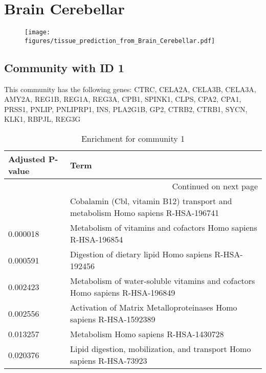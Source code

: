 
\section*{Brain Cerebellar}
\begin{figure}[h!]
\centering
\texttt{[image: figures/tissue\_prediction\_from\_Brain\_Cerebellar.pdf]}
\end{figure}



\subsection*{Community with ID 1}
This community has the following genes: CTRC, CELA2A, CELA3B, CELA3A, AMY2A, REG1B, REG1A, REG3A, CPB1, SPINK1, CLPS, CPA2, CPA1, PRSS1, PNLIP, PNLIPRP1, INS, PLA2G1B, GP2, CTRB2, CTRB1, SYCN, KLK1, RBPJL, REG3G
\\
\begin{longtable}{p{2.4cm}p{14.5cm}}
\caption{Enrichment for community 1}\\
\toprule
Adjusted \newline P-value &                                                                             Term \\
\midrule
\endhead
\midrule
\multicolumn{2}{r}{{Continued on next page}} \\
\midrule
\endfoot

\bottomrule
\endlastfoot
                 0.000017 &  Cobalamin (Cbl, vitamin B12) transport and metabolism Homo sapiens R-HSA-196741 \\
                 0.000018 &                   Metabolism of vitamins and cofactors Homo sapiens R-HSA-196854 \\
                 0.000591 &                             Digestion of dietary lipid Homo sapiens R-HSA-192456 \\
                 0.002423 &     Metabolism of water-soluble vitamins and cofactors Homo sapiens R-HSA-196849 \\
                 0.002556 &               Activation of Matrix Metalloproteinases Homo sapiens R-HSA-1592389 \\
                 0.013257 &                                            Metabolism Homo sapiens R-HSA-1430728 \\
                 0.020376 &            Lipid digestion, mobilization, and transport Homo sapiens R-HSA-73923 \\
\end{longtable}


